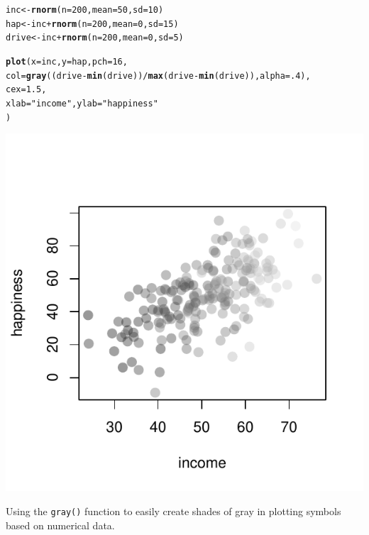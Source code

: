 \documentclass{tufte-book}\usepackage[]{graphicx}\usepackage[]{color}
\makeatletter
\def\maxwidth{ %
  \ifdim\Gin@nat@width>\linewidth
    \linewidth
  \else
    \Gin@nat@width
  \fi
}
\newcommand{\hlnum}[1]{\textcolor[rgb]{0.686,0.059,0.569}{#1}}%
\newcommand{\hlstr}[1]{\textcolor[rgb]{0.192,0.494,0.8}{#1}}%
\newcommand{\hlopt}[1]{\textcolor[rgb]{0,0,0}{#1}}%
\newcommand{\hlstd}[1]{\textcolor[rgb]{0.345,0.345,0.345}{#1}}%
\newcommand{\hlkwb}[1]{\textcolor[rgb]{0.69,0.353,0.396}{#1}}%
\newcommand{\hlkwc}[1]{\textcolor[rgb]{0.333,0.667,0.333}{#1}}%
\newcommand{\hlkwd}[1]{\textcolor[rgb]{0.737,0.353,0.396}{\textbf{#1}}}%
\newenvironment{kframe}{%
 \def\at@end@of@kframe{}%
 \ifinner\ifhmode%
  \def\at@end@of@kframe{\end{minipage}}%
  \begin{minipage}{\columnwidth}%
 \fi\fi%
 \def\FrameCommand##1{\hskip\@totalleftmargin \hskip-\fboxsep
 \colorbox{shadecolor}{##1}\hskip-\fboxsep
     \hskip-\linewidth \hskip-\@totalleftmargin \hskip\columnwidth}%
 \MakeFramed {\advance\hsize-\width
   \@totalleftmargin\z@ \linewidth\hsize
   \@setminipage}}%
 {\par\unskip\endMakeFramed%
 \at@end@of@kframe}
\newenvironment{knitrout}{}{} %
\makeatother
\begin{document}
\begin{marginfigure}

\begin{tiny}
\begin{knitrout}
\color{fgcolor}\begin{kframe}
\begin{alltt}
\hlstd{inc} \hlkwb{<-} \hlkwd{rnorm}\hlstd{(}\hlkwc{n} \hlstd{=} \hlnum{200}\hlstd{,} \hlkwc{mean} \hlstd{=} \hlnum{50}\hlstd{,} \hlkwc{sd} \hlstd{=} \hlnum{10}\hlstd{)}
\hlstd{hap} \hlkwb{<-} \hlstd{inc} \hlopt{+} \hlkwd{rnorm}\hlstd{(}\hlkwc{n} \hlstd{=} \hlnum{200}\hlstd{,} \hlkwc{mean} \hlstd{=} \hlnum{0}\hlstd{,} \hlkwc{sd} \hlstd{=} \hlnum{15}\hlstd{)}
\hlstd{drive} \hlkwb{<-} \hlstd{inc} \hlopt{+} \hlkwd{rnorm}\hlstd{(}\hlkwc{n} \hlstd{=} \hlnum{200}\hlstd{,} \hlkwc{mean} \hlstd{=} \hlnum{0}\hlstd{,} \hlkwc{sd} \hlstd{=} \hlnum{5}\hlstd{)}

\hlkwd{plot}\hlstd{(}\hlkwc{x} \hlstd{= inc,} \hlkwc{y} \hlstd{= hap,} \hlkwc{pch} \hlstd{=} \hlnum{16}\hlstd{,}
     \hlkwc{col} \hlstd{=} \hlkwd{gray}\hlstd{((drive} \hlopt{-} \hlkwd{min}\hlstd{(drive))} \hlopt{/} \hlkwd{max}\hlstd{(drive} \hlopt{-} \hlkwd{min}\hlstd{(drive)),} \hlkwc{alpha} \hlstd{=} \hlnum{.4}\hlstd{),}
     \hlkwc{cex} \hlstd{=} \hlnum{1.5}\hlstd{,}
     \hlkwc{xlab} \hlstd{=} \hlstr{"income"}\hlstd{,} \hlkwc{ylab} \hlstd{=} \hlstr{"happiness"}
     \hlstd{)}
\end{alltt}
\end{kframe}
\includegraphics[width=\maxwidth]{figure/unnamed-chunk-226-1} 

\end{knitrout}
\end{tiny}
\caption{Using the \texttt{gray()} function to easily create shades of gray in plotting symbols based on numerical data.}
\label{fig:incomegray}
\end{marginfigure}
\end{document}
